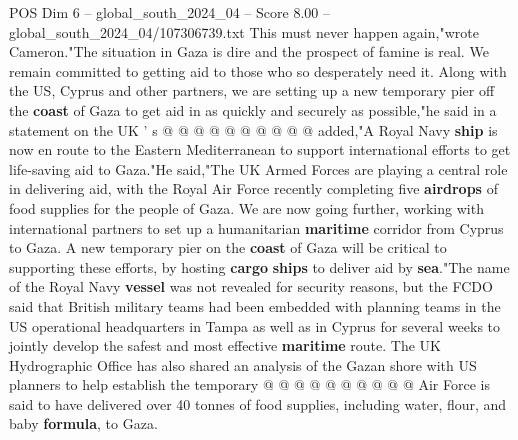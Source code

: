 \begin{textsample}{POS Dim 6 – global\_south\_2024\_04 – Score 8.00 – global\_south\_2024\_04/107306739.txt}
This must never happen again,"wrote Cameron."The situation in Gaza is dire and the prospect of famine is real.
We remain committed to getting aid to those who so desperately need it.
Along with the US, Cyprus and other partners, we are setting up a new temporary pier off the \textbf{coast} of Gaza to get aid in as quickly and securely as possible,"he said in a statement on the UK ' s @ @ @ @ @ @ @ @ @ @ added,"A Royal Navy \textbf{ship} is now en route to the Eastern Mediterranean to support international efforts to get life-saving aid to Gaza."He said,"The UK Armed Forces are playing a central role in delivering aid, with the Royal Air Force recently completing five \textbf{airdrops} of food supplies for the people of Gaza.
We are now going further, working with international partners to set up a humanitarian \textbf{maritime} corridor from Cyprus to Gaza.
A new temporary pier on the \textbf{coast} of Gaza will be critical to supporting these efforts, by hosting \textbf{cargo} \textbf{ships} to deliver aid by \textbf{sea}."The name of the Royal Navy \textbf{vessel} was not revealed for security reasons, but the FCDO said that British military teams had been embedded with planning teams in the US operational headquarters in Tampa as well as in Cyprus for several weeks to jointly develop the safest and most effective \textbf{maritime} route.
The UK Hydrographic Office has also shared an analysis of the Gazan shore with US planners to help establish the temporary @ @ @ @ @ @ @ @ @ @ Air Force is said to have delivered over 40 tonnes of food supplies, including water, flour, and baby \textbf{formula}, to Gaza.

\end{textsample}
